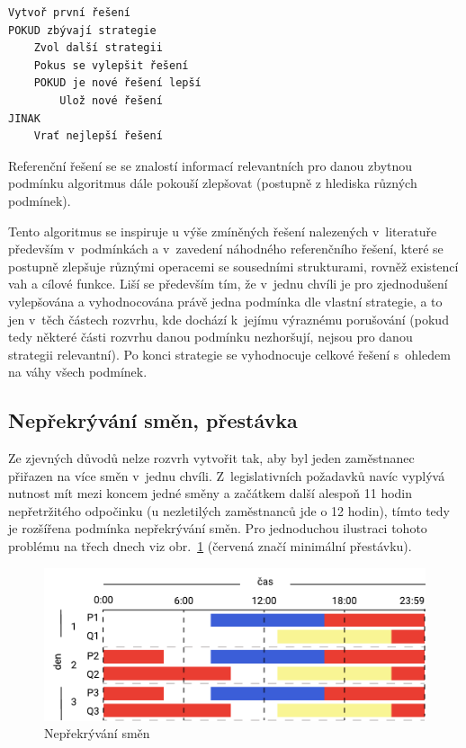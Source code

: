 \documentclass[twoside]{ctuthesis}
\begin{document}
\begin{lstlisting}[caption={Pseudokód rozvrhovacího algoritmu}, label={lst:scheduling}]
Vytvoř první řešení
POKUD zbývají strategie
	Zvol další strategii
	Pokus se vylepšit řešení
	POKUD je nové řešení lepší
		Ulož nové řešení
JINAK
	Vrať nejlepší řešení
\end{lstlisting}

Referenční řešení se se znalostí informací relevantních pro danou zbytnou podmínku algoritmus dále pokouší zlepšovat (postupně z hlediska různých podmínek).

Tento algoritmus se inspiruje u výše zmíněných řešení nalezených v~literatuře především v~podmínkách a v~zavedení náhodného referenčního řešení, které se postupně zlepšuje různými operacemi se sousedními strukturami, rovněž existencí vah a cílové funkce. Liší se především tím, že v~jednu chvíli je pro zjednodušení vylepšována a vyhodnocována právě jedna podmínka dle vlastní strategie, a to jen v~těch částech rozvrhu, kde dochází k~jejímu výraznému porušování (pokud tedy některé části rozvrhu danou podmínku nezhoršují, nejsou pro danou strategii relevantní). Po konci strategie se vyhodnocuje celkové řešení s~ohledem na váhy všech podmínek.

\subsection{Nepřekrývání směn, přestávka}
Ze zjevných důvodů nelze rozvrh vytvořit tak, aby byl jeden zaměstnanec přiřazen na více směn v~jednu chvíli. Z~legislativních požadavků navíc vyplývá nutnost mít mezi koncem jedné směny a začátkem další alespoň 11 hodin nepřetržitého odpočinku (u nezletilých zaměstnanců jde o 12 hodin), tímto tedy je rozšířena podmínka nepřekrývání směn. Pro jednoduchou ilustraci tohoto problému na třech dnech viz obr.~\ref{fig:shiftprecedencefull} (červená značí minimální přestávku).

\begin{figure}[h!]
	\includegraphics[scale=0.7]{img/shift-overlap.pdf}
	\caption{Nepřekrývání směn}
	\label{fig:shiftprecedencefull}
\end{figure}
\end{document}
